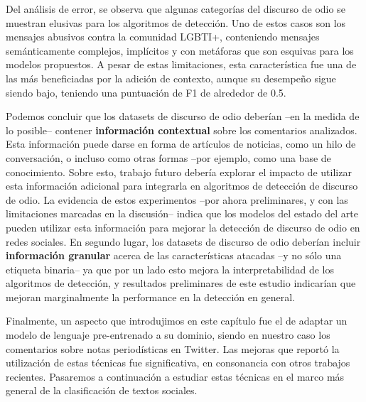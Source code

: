 Del análisis de error, se observa que algunas categorías del discurso de odio se muestran elusivas para los algoritmos de detección. Uno de estos casos son los mensajes abusivos contra la comunidad LGBTI+, conteniendo mensajes semánticamente complejos, implícitos y con metáforas que son esquivas para los modelos propuestos. A pesar de estas limitaciones, esta característica fue una de las más beneficiadas por la adición de contexto, aunque su desempeño sigue siendo bajo, teniendo una puntuación de F1 de alrededor de 0.5.

Podemos concluir que los datasets de discurso de odio deberían --en la medida de lo posible-- contener \textbf{información contextual} sobre los comentarios analizados. Esta información puede darse en forma de artículos de noticias, como un hilo de conversación, o incluso como otras formas --por ejemplo, como una base de conocimiento. Sobre esto, trabajo futuro debería explorar el impacto de utilizar esta información adicional para integrarla en algoritmos de detección de discurso de odio. La evidencia de estos experimentos --por ahora preliminares, y con las limitaciones marcadas en la discusión-- indica que los modelos del estado del arte pueden utilizar esta información para mejorar la detección de discurso de odio en redes sociales. En segundo lugar, los datasets de discurso de odio deberían incluir \textbf{información granular} acerca de las características atacadas --y no sólo una etiqueta binaria-- ya que por un lado esto mejora la interpretabilidad de los algoritmos de detección, y resultados preliminares de este estudio indicarían que mejoran marginalmente la performance en la detección en general.

Finalmente, un aspecto que introdujimos en este capítulo fue el de adaptar un modelo de lenguaje pre-entrenado a su dominio, siendo en nuestro caso los comentarios sobre notas periodísticas en Twitter. Las mejoras que reportó la utilización de estas técnicas fue significativa, en consonancia con otros trabajos recientes. Pasaremos a continuación a estudiar estas técnicas en el marco más general de la clasificación de textos sociales.